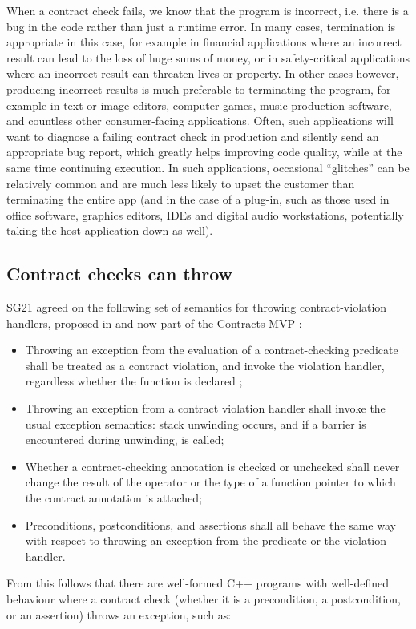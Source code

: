 When a contract check fails, we know that the program is incorrect, i.e. there is a bug in the code rather than just a runtime error. In many cases, termination is appropriate in this case, for example in financial applications where an incorrect result can lead to the loss of huge sums of money, or in safety-critical applications where an incorrect result can threaten lives or property. In other cases however, producing incorrect results is much preferable to terminating the program, for example in text or image editors, computer games, music production software, and countless other consumer-facing applications. Often, such applications will want to diagnose a failing contract check in production and silently send an appropriate bug report, which greatly helps improving code quality, while at the same time continuing execution. In such applications, occasional ``glitches'' can be relatively common and are much less likely to upset the customer than terminating the entire app (and in the case of a plug-in, such as those used in office software, graphics editors, IDEs and digital audio workstations, potentially taking the host application down as well). 

\subsection{Contract checks can throw}

SG21 agreed on the following set of semantics for throwing contract-violation handlers, proposed in \cite{P2811R7} and now part of the Contracts MVP \cite{P2900R1}:
\begin{itemize}
\item Throwing an exception from the evaluation of a contract-checking predicate shall be treated as a contract violation, and invoke the violation handler, regardless whether the function is declared ;
\item Throwing an exception from a contract violation handler shall invoke the usual exception semantics: stack unwinding occurs, and if a  barrier is encountered during unwinding,  is called;
\item Whether a contract-checking annotation is checked or unchecked shall never change the result of the  operator or the type of a function pointer to which the contract annotation is attached;
\item Preconditions, postconditions, and assertions shall all behave the same way with respect to throwing an exception from the predicate or the violation handler.
\end{itemize}
From this follows that there are well-formed C++ programs with well-defined behaviour where a contract check (whether it is a precondition, a postcondition, or an assertion) throws an exception, such as:

